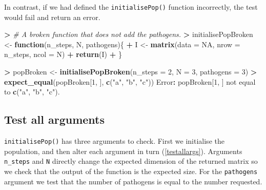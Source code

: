 \documentclass[]{elsarticle} %
\newenvironment{Shaded}{\begin{snugshade}}{\end{snugshade}}
\newcommand{\CommentTok}[1]{\textcolor[rgb]{0.56,0.35,0.01}{\textit{#1}}}
\newcommand{\ControlFlowTok}[1]{\textcolor[rgb]{0.13,0.29,0.53}{\textbf{#1}}}
\newcommand{\DataTypeTok}[1]{\textcolor[rgb]{0.13,0.29,0.53}{#1}}
\newcommand{\DecValTok}[1]{\textcolor[rgb]{0.00,0.00,0.81}{#1}}
\newcommand{\ErrorTok}[1]{\textcolor[rgb]{0.64,0.00,0.00}{\textbf{#1}}}
\newcommand{\KeywordTok}[1]{\textcolor[rgb]{0.13,0.29,0.53}{\textbf{#1}}}
\newcommand{\NormalTok}[1]{#1}
\newcommand{\OperatorTok}[1]{\textcolor[rgb]{0.81,0.36,0.00}{\textbf{#1}}}
\newcommand{\OtherTok}[1]{\textcolor[rgb]{0.56,0.35,0.01}{#1}}
\newcommand{\StringTok}[1]{\textcolor[rgb]{0.31,0.60,0.02}{#1}}
\begin{document}
In contrast, if we had defined the \texttt{initialisePop()} function incorrectly, the test would fail and return an error.
\newline
{}\label{testerror}

\begin{Shaded}
\begin{Highlighting}[]
\OperatorTok{>}\StringTok{ }\CommentTok{# A broken function that does not add the pathogens.}
\ErrorTok{>}\StringTok{ }\NormalTok{initialisePopBroken <-}\StringTok{ }\ControlFlowTok{function}\NormalTok{(n_steps, N, pathogens)\{}
\OperatorTok{+}\StringTok{   }\NormalTok{I <-}\StringTok{ }\KeywordTok{matrix}\NormalTok{(}\DataTypeTok{data =} \OtherTok{NA}\NormalTok{, }\DataTypeTok{nrow =}\NormalTok{ n_steps, }\DataTypeTok{ncol =}\NormalTok{ N)}
\OperatorTok{+}\StringTok{   }\KeywordTok{return}\NormalTok{(I)}
\OperatorTok{+}\StringTok{ }\NormalTok{\}}

\OperatorTok{>}\StringTok{ }\NormalTok{popBroken <-}\StringTok{ }\KeywordTok{initialisePopBroken}\NormalTok{(}\DataTypeTok{n_steps =} \DecValTok{2}\NormalTok{, }\DataTypeTok{N =} \DecValTok{3}\NormalTok{, }
                                   \DataTypeTok{pathogens =} \DecValTok{3}\NormalTok{) }
\OperatorTok{>}\StringTok{ }\KeywordTok{expect_equal}\NormalTok{(popBroken[}\DecValTok{1}\NormalTok{, ], }\KeywordTok{c}\NormalTok{(}\StringTok{"a"}\NormalTok{, }\StringTok{"b"}\NormalTok{, }\StringTok{"c"}\NormalTok{))}
\NormalTok{Error}\OperatorTok{:}\StringTok{ }\NormalTok{popBroken[}\DecValTok{1}\NormalTok{, ] not equal to }\KeywordTok{c}\NormalTok{(}\StringTok{"a"}\NormalTok{, }\StringTok{"b"}\NormalTok{, }\StringTok{"c"}\NormalTok{).}
\end{Highlighting}
\end{Shaded}

\hypertarget{testargs}{%
\subsection*{Test all arguments}\label{testargs}}

\texttt{initialisePop()} has three arguments to check.
First we initialise the population, and then alter each argument in turn (\ref{testallargs}).
Arguments \texttt{n\_steps} and \texttt{N} directly change the expected dimension of the returned matrix so we check that the output of the function is the expected size.
For the \texttt{pathogens} argument we test that the number of pathogens is equal to the number requested.
\newline
{}\label{testallargs}
\end{document}
